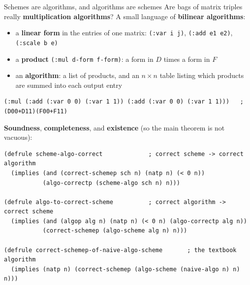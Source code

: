 \documentclass[aspectratio=169,10pt]{beamer}
\newcommand{\code}[1]{\texttt{#1}}
\begin{document}
\begin{frame}[fragile]{Schemes are algorithms, and algorithms are schemes}
  Are bags of matrix triples really \textbf{multiplication algorithms}?
  A small language of \textbf{bilinear algorithms}:
  \begin{itemize}
    \item a \textbf{linear form} in the entries of one matrix:
      \code{(:var i j)}, \code{(:add e1 e2)}, \code{(:scale b e)}
    \item a \textbf{product} \code{(:mul d-form f-form)}: a form in $D$
      times a form in $F$
    \item an \textbf{algorithm}: a list of products, and an $n\times n$
      table listing which products are summed into each output entry
  \end{itemize}
\begin{lstlisting}
(:mul (:add (:var 0 0) (:var 1 1)) (:add (:var 0 0) (:var 1 1)))   ; (D00+D11)(F00+F11)
\end{lstlisting}
  \textbf{Soundness}, \textbf{completeness}, and \textbf{existence} (so
  the main theorem is not vacuous):
\begin{lstlisting}
(defrule scheme-algo-correct             ; correct scheme -> correct algorithm
  (implies (and (correct-schemep sch n) (natp n) (< 0 n))
           (algo-correctp (scheme-algo sch n) n)))

(defrule algo-to-correct-scheme          ; correct algorithm -> correct scheme
  (implies (and (algop alg n) (natp n) (< 0 n) (algo-correctp alg n))
           (correct-schemep (algo-scheme alg n) n)))

(defrule correct-schemep-of-naive-algo-scheme       ; the textbook algorithm
  (implies (natp n) (correct-schemep (algo-scheme (naive-algo n) n) n)))
\end{lstlisting}
\end{frame}
\end{document}
